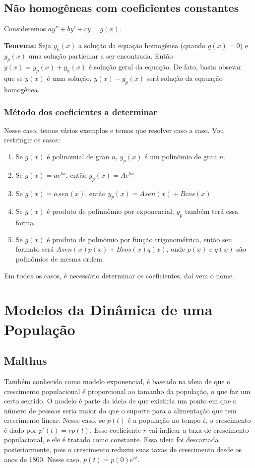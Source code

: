 \documentclass[12pt]{article}
\begin{document}
\subsection{Não homogêneas com coeficientes constantes}

Consideremos $ay'' + by' + cy = g(x)$. 

\textbf{Teorema:} Seja $y_h(x)$ a solução da equação homogênea (quando $g(x) =
0$) e $y_p(x)$ uma solução particular a ser encontrada. Então $y(x) = y_p(x) +
y_h(x)$ é solução geral da equação. De fato, basta obsevar que se $y(x)$ é uma
solução, $y(x) - y_p(x)$ será solução da eqauação homogênea. 

\subsubsection{Método dos coeficientes a determinar}

Nesse caso, temos vários exemplos e temos que resolver caso a caso. Vou
restringir os casos:

\begin{enumerate}
    \item Se $g(x)$ é polinomial de grau $n$, $y_p(x)$ é um polinômio de grau
    $n$. 
    \item Se $g(x) = ae^{bx}$, então $y_p(x) = Ae^{bx}$
    \item Se $g(x) = \alpha sen(x)$, então $y_p(x) = Asen(x) + Bcos(x)$
    \item Se $g(x)$ é produto de polinnômio por exponencial, $y_p$ também terá
   essa forma. 
   \item Se $g(x)$ é produto de polinômio por função trigonométrica, então seu
  formato será  $Asen(x)p(x) + Bcos(x)q(x)$, onde $p(x)$ e $q(x)$ são
  polinômios de mesma ordem. 
\end{enumerate}

Em todos os casos, é necessário determinar os coeficientes, daí vem o nome. 
    
\section{Modelos da Dinâmica de uma População}

\subsection{Malthus} 
Também conhecido como modelo exponencial, é
baseado na ideia de que o crescimento populacional é proporcional ao
tamanho da população, o que faz um certo sentido. O modelo é parte da
ideia de que existiria um ponto em que o número de pessoas seria maior do
que o suporte para a alimentação que tem crescimento linear. Nesse caso,
se $p(t)$ é a população no tempo $t$, o crescimento é dado por $p'(t) =
rp(t)$. Esse coeficiente $r$ vai indicar a taxa de crescimento
populacional, e ele é tratado como constante. Essa ideia foi descartada
posteriormente, pois o crescimento reduziu suas taxas de crescimento desde
os anos de 1800. Nesse caso, $p(t) = p(0)e^{rt}$. 
\end{document}
